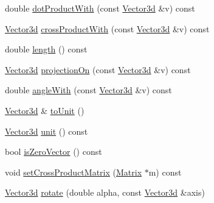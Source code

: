 \begin{DoxyCompactItemize}
double \hyperlink{classCartWheel_1_1Math_1_1Vector3d_a1125939f0844bb820b4e9ca9abd744ef}{dotProductWith} (const \hyperlink{classCartWheel_1_1Math_1_1Vector3d}{Vector3d} \&v) const 
\item 
\hyperlink{classCartWheel_1_1Math_1_1Vector3d}{Vector3d} \hyperlink{classCartWheel_1_1Math_1_1Vector3d_a00283de03507da30bf2a9e8ce84b22bd}{crossProductWith} (const \hyperlink{classCartWheel_1_1Math_1_1Vector3d}{Vector3d} \&v) const 
\item 
double \hyperlink{classCartWheel_1_1Math_1_1Vector3d_a2e5dcd4167c46a70c0a9eedd0e1abcd1}{length} () const 
\item 
\hyperlink{classCartWheel_1_1Math_1_1Vector3d}{Vector3d} \hyperlink{classCartWheel_1_1Math_1_1Vector3d_ae192e902fc815e3b9fe71cfb169c3876}{projectionOn} (const \hyperlink{classCartWheel_1_1Math_1_1Vector3d}{Vector3d} \&v) const 
\item 
double \hyperlink{classCartWheel_1_1Math_1_1Vector3d_a5a81a069ee08897a24a6dc60c12d463d}{angleWith} (const \hyperlink{classCartWheel_1_1Math_1_1Vector3d}{Vector3d} \&v) const 
\item 
\hyperlink{classCartWheel_1_1Math_1_1Vector3d}{Vector3d} \& \hyperlink{classCartWheel_1_1Math_1_1Vector3d_af4cfde7678c0584227451f761effdab5}{toUnit} ()
\item 
\hyperlink{classCartWheel_1_1Math_1_1Vector3d}{Vector3d} \hyperlink{classCartWheel_1_1Math_1_1Vector3d_a786026642333f9bcbdfdb69ec40c27a7}{unit} () const 
\item 
bool \hyperlink{classCartWheel_1_1Math_1_1Vector3d_aeba6f76ad4966a70d49ec9d56bd01f09}{isZeroVector} () const 
\item 
void \hyperlink{classCartWheel_1_1Math_1_1Vector3d_ad5f838194669d4521212f5aaba53cc00}{setCrossProductMatrix} (\hyperlink{classCartWheel_1_1Math_1_1Matrix}{Matrix} $\ast$m) const 
\item 
\hyperlink{classCartWheel_1_1Math_1_1Vector3d}{Vector3d} \hyperlink{classCartWheel_1_1Math_1_1Vector3d_a62f9c8629f9b4e6952c90e5abb4a226e}{rotate} (double alpha, const \hyperlink{classCartWheel_1_1Math_1_1Vector3d}{Vector3d} \&axis)
\end{DoxyCompactItemize}


